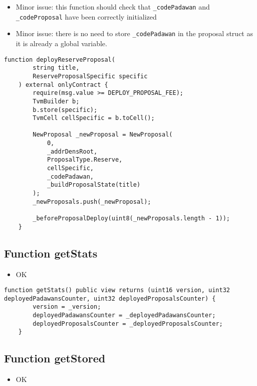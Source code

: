 \begin{itemize}
\item Minor issue: this function should check that {\tt \_codePadawan} and {\tt \_codeProposal}
  have been correctly initialized
\item Minor issue: there is no need to store {\tt \_codePadawan} in the proposal struct as it is
  already a global variable.
\end{itemize}

\begin{lstlisting}[firstnumber=112]
    function deployReserveProposal(
        string title,
        ReserveProposalSpecific specific
    ) external onlyContract {
        require(msg.value >= DEPLOY_PROPOSAL_FEE);
        TvmBuilder b;
        b.store(specific);
        TvmCell cellSpecific = b.toCell();

        NewProposal _newProposal = NewProposal(
            0,
            _addrDensRoot,
            ProposalType.Reserve,
            cellSpecific,
            _codePadawan,
            _buildProposalState(title)
        );
        _newProposals.push(_newProposal);
        
        _beforeProposalDeploy(uint8(_newProposals.length - 1));
    }
\end{lstlisting}

\subsection{Function getStats}

\begin{itemize}
\item OK
\end{itemize}

\begin{lstlisting}[firstnumber=214]
    function getStats() public view returns (uint16 version, uint32 deployedPadawansCounter, uint32 deployedProposalsCounter) {
        version = _version;
        deployedPadawansCounter = _deployedPadawansCounter;
        deployedProposalsCounter = _deployedProposalsCounter;
    }
\end{lstlisting}

\subsection{Function getStored}

\begin{itemize}
\item OK
\end{itemize}

